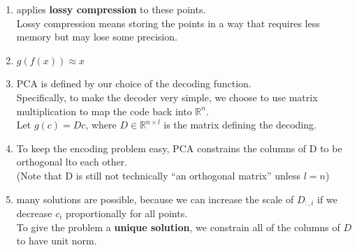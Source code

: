 \begin{enumerate}
    \item applies \textbf{lossy compression} to these points.\\
    Lossy compression means storing the points in a way that requires less memory but may lose some precision.

    \item $g(f(x)) \approx x$

    \item PCA is defined by our choice of the decoding function. \\
    Specifically, to make the decoder very simple, we choose to use matrix multiplication to map the code back into $\mathbb{R}^n$.\\
    Let $g(c) = Dc$, where $D \in \mathbb{R}^{n\times l}$ is the matrix defining the decoding.

    \item To keep the encoding problem easy, PCA constrains the columns of D to be orthogonal lto each other.\\
    (Note that D is still not technically “an orthogonal matrix” unless $l=n$)

    \item many solutions are possible, because we can increase the scale of $D_{:,i}$ if we decrease $c_i$ proportionally for all points.\\
    To give the problem a \textbf{unique solution}, we constrain all of the columns of $D$ to have unit norm.


\end{enumerate}
